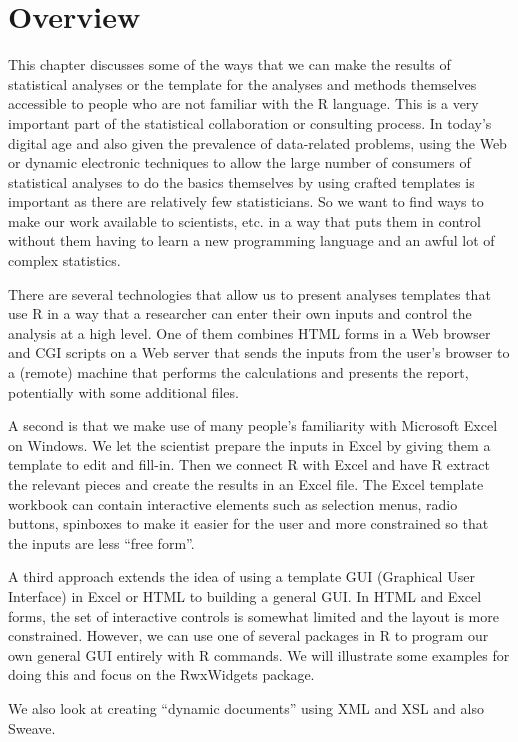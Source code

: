 
\section{Overview}
This chapter discusses some of the ways that we can make the results
of statistical analyses or the template for the analyses and methods
themselves accessible to people who are not familiar with the R
language.  This is a very important part of the statistical
collaboration or consulting process. In today's digital age and also
given the prevalence of data-related problems, using the Web or
dynamic electronic techniques to allow the large number of consumers
of statistical analyses to do the basics themselves by using crafted
templates is important as there are relatively few statisticians.
So we want to find ways to make our work available to scientists, etc.
in a way that puts them in control without them having to learn
a  new programming language and an awful lot of complex statistics.

There are several technologies that allow us to present 
analyses  templates that use R in a way that a researcher
can enter their own inputs and control the analysis at a high level.
One of them combines HTML forms in a Web browser and CGI scripts
on a Web server that sends the inputs from the user's browser
to a (remote) machine that performs the calculations and presents
the report, potentially with some additional files.

A second is that we make use of many people's familiarity with
Microsoft Excel on Windows. We let the scientist prepare the inputs in
Excel by giving them a template to edit and fill-in.  Then we connect
R with Excel and have R extract the relevant pieces and create the
results in an Excel file. The Excel template workbook can contain
interactive elements such as selection menus, radio buttons, spinboxes
to make it easier for the user and more constrained so that the inputs
are less ``free form''.

A third approach extends the idea of using a template GUI (Graphical
User Interface) in Excel or HTML to building a general GUI.
In HTML and Excel forms, the set of interactive controls is somewhat
limited and the layout is more constrained.  However, 
we can use one of several packages in R to program our own general
GUI entirely with R commands. We will illustrate some examples for 
doing this and focus on the RwxWidgets package.

We also look at creating ``dynamic documents'' using
XML and XSL and also Sweave.


